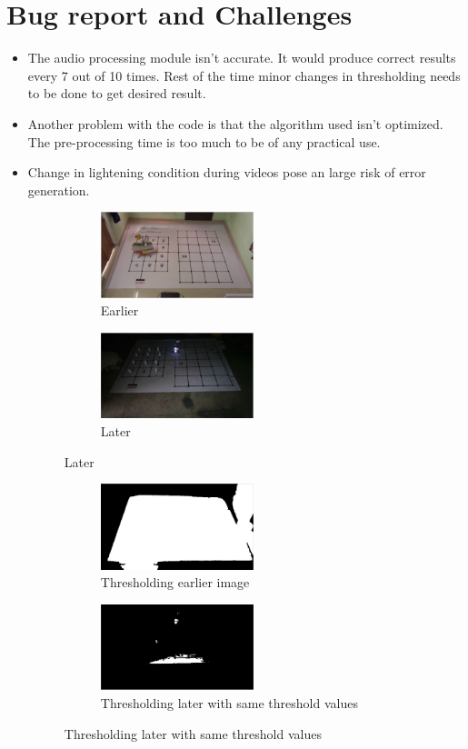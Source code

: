 \documentclass[a4paper,12pt,oneside]{book}
\begin{document}
\section{Bug report and Challenges}
\begin{itemize}
\item The audio processing module isn't accurate. It would produce correct results every 7 out of 10 times. Rest of the time minor changes in thresholding needs to be done to get desired result.
\item Another problem with the code is that the algorithm used isn't optimized. The pre-processing time is too much to be of any practical use.
\item Change in lightening condition during videos pose an large risk of error generation.
    \begin{figure}[h!]
		\begin{subfigure}{0.4\textwidth}			\includegraphics[width=1\linewidth, height=2.5cm]{1.JPG}
			\caption{Earlier}
		\end{subfigure}
		\begin{subfigure}{0.4\textwidth}
			\includegraphics[width=1\linewidth, height=2.5cm]{3.JPG}
			\caption{Later}
		\end{subfigure}
	\end{figure}	
	 \begin{figure}[h!]
		\begin{subfigure}{0.4\textwidth}
			\includegraphics[width=1\linewidth, height=2.5cm]{11.JPG}
			\caption{Thresholding earlier image}
		\end{subfigure}
		\begin{subfigure}{0.4\textwidth}
			\includegraphics[width=1\linewidth, height=2.5cm]{33.JPG}
			\caption{Thresholding later with same threshold values}
		\end{subfigure}
	\end{figure}
\end{itemize}
\end{document}

